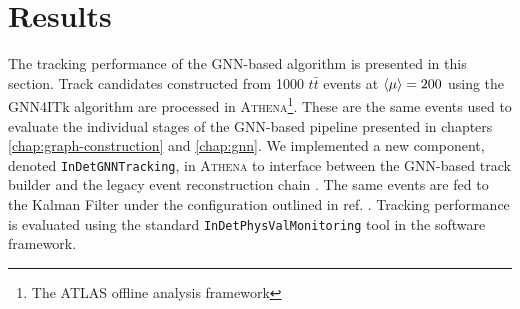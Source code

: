 \section{Results}
\label{sect:track-performance}

The tracking performance of the GNN-based algorithm is presented in this section. 
Track candidates constructed from 1000 $t\bar{t}$ events at $\expval{\mu}=200$ using the GNN4ITk algorithm are processed in \textsc{Athena}\footnote{The ATLAS offline analysis framework}. 
These are the same events used to evaluate the individual stages of the GNN-based pipeline presented in chapters \ref{chap:graph-construction} and \ref{chap:gnn}. 
We implemented a new component, denoted \texttt{InDetGNNTracking}, in \textsc{Athena} to interface between the GNN-based track builder and the legacy event reconstruction chain \cite{atlas_collaboration_2021_4772550}.
The same events are fed to the Kalman Filter under the configuration outlined in ref. \cite{Aad_2025}.
Tracking performance is evaluated using the standard \texttt{InDetPhysValMonitoring} tool in the software framework.

